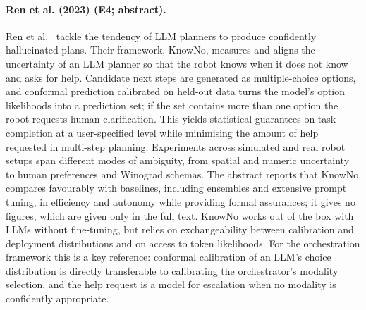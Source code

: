\documentclass[10pt,a4paper]{article}
\begin{document}
\paragraph{Ren et al. (2023) (E4; abstract).} Ren et al.~\cite{Ren2023} tackle the tendency of LLM planners to produce confidently hallucinated plans. Their framework, KnowNo, measures and aligns the uncertainty of an LLM planner so that the robot knows when it does not know and asks for help. Candidate next steps are generated as multiple-choice options, and conformal prediction calibrated on held-out data turns the model's option likelihoods into a prediction set; if the set contains more than one option the robot requests human clarification. This yields statistical guarantees on task completion at a user-specified level while minimising the amount of help requested in multi-step planning. Experiments across simulated and real robot setups span different modes of ambiguity, from spatial and numeric uncertainty to human preferences and Winograd schemas. The abstract reports that KnowNo compares favourably with baselines, including ensembles and extensive prompt tuning, in efficiency and autonomy while providing formal assurances; it gives no figures, which are given only in the full text. KnowNo works out of the box with LLMs without fine-tuning, but relies on exchangeability between calibration and deployment distributions and on access to token likelihoods. For the orchestration framework this is a key reference: conformal calibration of an LLM's choice distribution is directly transferable to calibrating the orchestrator's modality selection, and the help request is a model for escalation when no modality is confidently appropriate.
\end{document}
